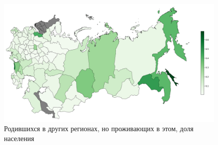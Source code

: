 \documentclass[a4paper,12pt]{article}
\begin{document}
\begin{landscape}
\begin{figure}[h!]
	\includegraphics[height=0.85\textwidth]{mig_of_pop_to.png}
	\caption{Родившихся в других регионах, но проживающих в этом, доля населения}
	\label{fig:to}
\end{figure}

\end{landscape}
\end{document}
